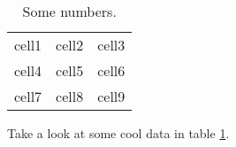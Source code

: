 \documentclass{article}
\begin{document}
  \begin{table}[h]
    \begin{tabular}{ c c c }
       cell1 & cell2 & cell3 \\
       cell4 & cell5 & cell6 \\
       cell7 & cell8 & cell9
    \end{tabular}
    \caption{Some numbers.}
    \label{table:1}
  \end{table}

  Take a look at some cool data in table \ref{table:1}.
\end{document}
